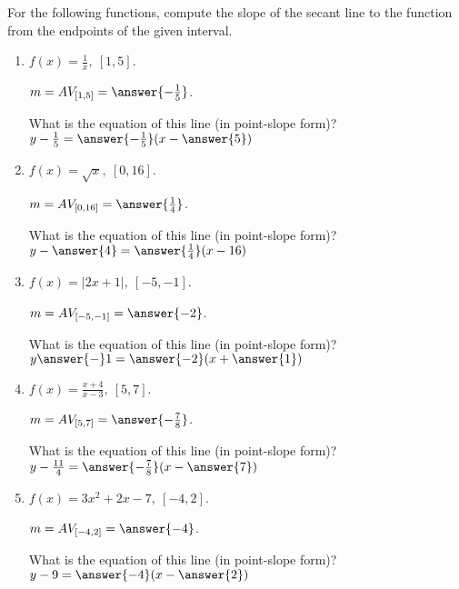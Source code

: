 \documentclass{ximera}
\author{Elizabeth Campolongo}
\begin{document}
\begin{exercise}

For the following functions, compute the slope of the secant line to the function from the endpoints of the given interval.

\begin{enumerate}
\item $f(x)= \frac{1}{x}, \ [1,5]$.

$m = AV_{[1, 5]} = \answer{-\frac{1}{5}}$.  
\begin{exercise}
What is the equation of this line (in point-slope form)?\\
$y-\frac{1}{5} = \answer{-\frac{1}{5}}(x-\answer{5})$
\end{exercise}

\item $f(x)= \sqrt{x}, \ [0,16]$.

$m = AV_{[0, 16]} = \answer{\frac{1}{4}}$.  
\begin{exercise}
What is the equation of this line (in point-slope form)?\\
$y-\answer{4} = \answer{\frac{1}{4}}(x-16)$
\end{exercise}

\item $f(x)= |2x+1|, \ [-5,-1]$.

$m = AV_{[-5,-1]} = \answer{-2}$.  
\begin{exercise}
What is the equation of this line (in point-slope form)?\\
$y\answer{-} 1= \answer{-2}(x+\answer{1})$
\end{exercise}


\item $f(x)= \frac{x+4}{x-3}, \ [5,7]$.

$m = AV_{[5, 7]} = \answer{-\frac{7}{8}}$.  
\begin{exercise}
What is the equation of this line (in point-slope form)?\\
$y-\frac{11}{4} = \answer{-\frac{7}{8}}(x-\answer{7})$
\end{exercise}

\item $f(x)= 3x^2 +2x-7, \ [-4,2]$.

$m = AV_{[-4, 2]} = \answer{-4}$.  
\begin{exercise}
What is the equation of this line (in point-slope form)?\\
$y-9 = \answer{-4}(x -\answer{2})$
\end{exercise}
	
\end{enumerate}

\end{exercise}
\end{document}

